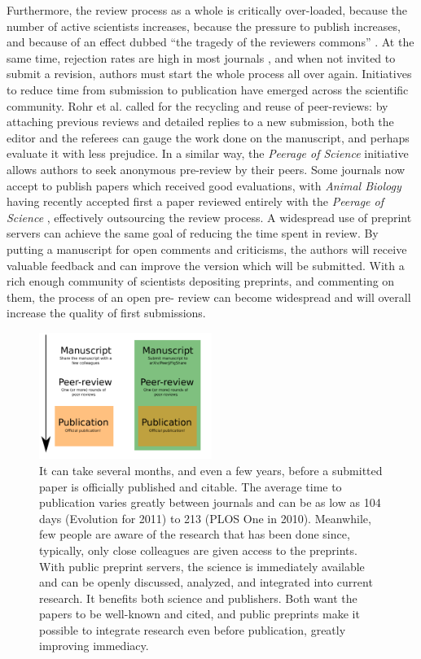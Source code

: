 \documentclass[letterpaper,twocolumn,superscriptaddress,showkeys,longbibliography]{revtex4-1}
\begin{document}
Furthermore, the review process as a whole is critically over-loaded, because
the number of active scientists increases, because the pressure to publish
increases, and because of an effect dubbed ``the tragedy of the reviewers
commons'' \cite{hoc09}.  At the same time, rejection rates are high in most journals
\cite{aar08,roh09}, and when not invited to submit a revision, authors must start the whole
process all over again.  Initiatives to reduce time from submission to
publication have emerged across the scientific community. Rohr et al.
\cite{roh09} called for the recycling and reuse of peer-reviews:
by attaching previous reviews and detailed replies to a new submission, both
the editor and the referees can gauge the work done on the manuscript, and
perhaps evaluate it with less prejudice. In a similar way, the \emph{Peerage
of Science} initiative allows authors to seek anonymous pre-review by their
peers. Some journals now accept to publish papers which received good
evaluations, with \emph{Animal Biology} having recently accepted first a paper
reviewed entirely with the \emph{Peerage of Science} \cite{abb12}, effectively
outsourcing the review process. A widespread use of preprint servers can
achieve the same goal of reducing the time spent in review. By putting a
manuscript for open comments and criticisms, the authors will receive valuable
feedback and can improve the version which will be submitted. With a rich
enough community of scientists depositing preprints, and commenting on them,
the process of an open pre- review can become widespread and will overall
increase the quality of first submissions.

\begin{figure}[ht!] \centering\includegraphics[width=0.50\textwidth]{map.pdf}
\caption { It can take several months, and even a few years, before a submitted
paper is officially published and citable.  The average time to publication
varies greatly between journals and can be as low as 104 days (Evolution for
2011) to 213 (PLOS One in 2010).  Meanwhile, few people are aware of the
research that has been done since, typically, only close colleagues are given
access to the preprints. With public preprint servers, the science is
immediately available and can be openly discussed, analyzed, and integrated into
current research. It benefits both science and publishers. Both want the papers
to be well-known and cited, and public preprints make it possible to integrate
research even before publication, greatly improving immediacy.  }
\label{fig:map} \end{figure}
\end{document}
